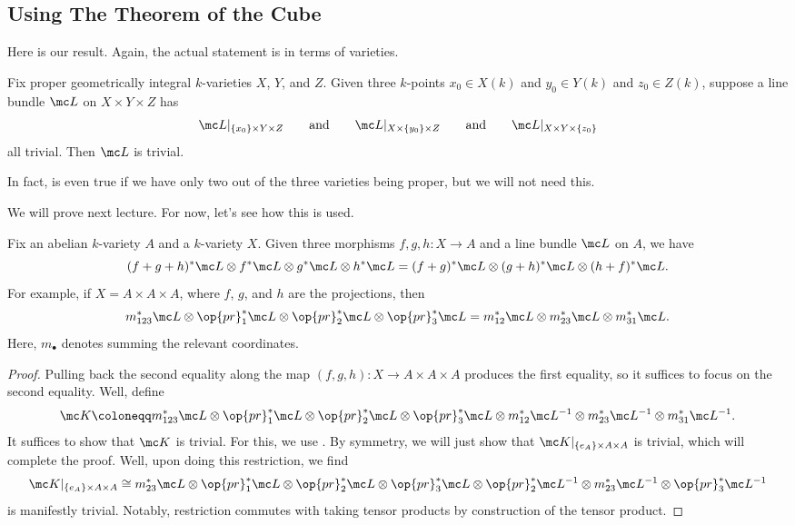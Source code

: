 \documentclass[../notes.tex]{subfiles}
\begin{document}
\subsection{Using The Theorem of the Cube}
Here is our result. Again, the actual statement is in terms of varieties.
\begin{theorem} \label{thm:cube}
	Fix proper geometrically integral $k$-varieties $X$, $Y$, and $Z$. Given three $k$-points $x_0\in X(k)$ and $y_0\in Y(k)$ and $z_0\in Z(k)$, suppose a line bundle $\mc L$ on $X\times Y\times Z$ has
	\[\mc L|_{\{x_0\}\times Y\times Z}\qquad\text{and}\qquad\mc L|_{X\times\{y_0\}\times Z}\qquad\text{and}\qquad\mc L|_{X\times Y\times\{z_0\}}\]
	all trivial. Then $\mc L$ is trivial.
\end{theorem}
\begin{remark}
	In fact,  is even true if we have only two out of the three varieties being proper, but we will not need this.
\end{remark}
We will prove  next lecture. For now, let's see how this is used.
\begin{corollary} \label{cor:cube-av}
	Fix an abelian $k$-variety $A$ and a $k$-variety $X$. Given three morphisms $f,g,h\colon X\to A$ and a line bundle $\mc L$ on $A$, we have
	\[(f+g+h)^*\mc L\otimes f^*\mc L\otimes g^*\mc L\otimes h^*\mc L=(f+g)^*\mc L\otimes(g+h)^*\mc L\otimes(h+f)^*\mc L.\]
	For example, if $X=A\times A\times A$, where $f$, $g$, and $h$ are the projections, then
	\[m_{123}^*\mc L\otimes\op{pr}_1^*\mc L\otimes\op{pr}_2^*\mc L\otimes\op{pr}_3^*\mc L=m_{12}^*\mc L\otimes m_{23}^*\mc L\otimes m_{31}^*\mc L.\]
	Here, $m_\bullet$ denotes summing the relevant coordinates.
\end{corollary}
\begin{proof}
	Pulling back the second equality along the map $(f,g,h)\colon X\to A\times A\times A$ produces the first equality, so it suffices to focus on the second equality. Well, define
	\[\mc K\coloneqq m_{123}^*\mc L\otimes\op{pr}_1^*\mc L\otimes\op{pr}_2^*\mc L\otimes\op{pr}_3^*\mc L\otimes m_{12}^*\mc L^{-1}\otimes m_{23}^*\mc L^{-1}\otimes m_{31}^*\mc L^{-1}.\]
	It suffices to show that $\mc K$ is trivial. For this, we use . By symmetry, we will just show that $\mc K|_{\{e_A\}\times A\times A}$ is trivial, which will complete the proof. Well, upon doing this restriction, we find
	\[\mc K|_{\{e_A\}\times A\times A}\cong m_{23}^*\mc L\otimes\op{pr}_1^*\mc L\otimes\op{pr}_2^*\mc L\otimes\op{pr}_3^*\mc L\otimes \op{pr}_2^*\mc L^{-1}\otimes m_{23}^*\mc L^{-1}\otimes\op{pr}_{3}^*\mc L^{-1}\]
	is manifestly trivial. Notably, restriction commutes with taking tensor products by construction of the tensor product.
\end{proof}
\end{document}
